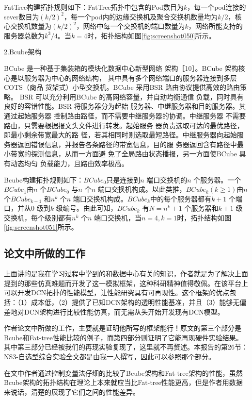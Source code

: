 \documentclass[lang=cn,11pt,a4paper,cite=authoryear]{elegantpaper}
\begin{document}
FatTree构建拓扑规则如下：FatTree拓扑中包含的Pod数目为$k$，每一个pod连接的sever数目为$(k/2)^2$，每一个pod内的边缘交换机及聚合交换机数量均为$k/2$，核心交换机数量为$(k/2)^2$，网络中每一个交换机的端口数量为$k$，网络所能支持的服务器总数为$k^3/4$。当$k=4$时，拓扑结构如图\ref{fig:screenshot050}所示。


2.Bcube架构

BCube 是一种基于集装箱的模块化数据中心新型网络
架构［10］。BCube 架构核心是以服务器为中心的网络结构，
其中具有多个网络端口的服务器连接到多层COTS（商品
货架式）小型交换机。BCube 采用BSR 路由协议提供高效的路由策略。
BSR 可以充分利用BCube 的高网络容量，并自动均衡通信
负载，同时具有良好的容错性能。BSR 将服务器分为起始
服务器、中继服务器和目的服务器。其通过起始服务器
控制路由路径，而不需要中继服务器的协调。中继服务器
不需要路由，只需要根据报文头文件进行转发。起始服务
器负责选取可达的最优路径，即最小剩余带宽最大的路
径，若其相同时则选取最短路径。中继服务器向起始服
务器返回错误信息，并报告各条路径的带宽信息，目的服
务器返回含有路径中最小带宽的探测信息，从而一方面避
免了全局路由状态播报，另一方面使BCube 具有动态均匀
负载能力，且路由效率极高。

Bcube构建拓扑规则如下：$BCube_0$只是连接到$n$ 端口交换机的$n$ 个服务器。一个$BCube_1$由$n$ 个$BCube_0$ 与$n$ 个$n$ 端口交换机构成。以此类推，$BCube_k$$(k\geq1)$由$n$ 个$BCube_{k-1}$ 和$n^k$ 个$n$ 端口交换机构成。$BCube_k$中的每个服务器都有$k + 1$ 个端口，并从$0$ 级到$k$ 级编号。由此可知，$BCube_k$ 有$N = n^k +1$ 个服务器和$k + 1$ 级交换机，每个级别都有$n^k$ 个$n$ 端口交换机，当$n=4,k=1$时，拓扑结构如图\ref{fig:screenshot051}所示。

\subsection{论文中所做的工作}

上面讲的是我在学习过程中学到的和数据中心有关的知识，作者就是为了解决上面提到的那些仿真难题而开发了这一模拟框架，这种科研精神值得敬佩。在该平台上可以开发DCN拓扑的性能模型，让性能研究具有可再现性。这个框架的优点包括：（1）成本低，（2）提供了已知DCN架构的透明性能基准，并且（3）能够无偏差地对DCN架构进行比较性能仿真，而无需从头开始开发现有DCN模型。

作者论文中所做的工作，主要就是证明他所写的框架能行！原文的第三个部分是Bcube和Fat-tree性能比较的例子，而第四部分则证明了它能再现硬件实验结果。其中第三部分已经被我们的再现实验复现了，这里就不再赘述。本报告的第26节：NS3-自选型综合实验全文都是由我一人撰写，因此可以参照那个部分。

在文中作者通过控制变量法仔细的比较了Bcube架构和Fat-tree架构的性能，虽然Bcube架构的拓扑结构在理论上本来就应当比Fat-tree性能更高，但是作者用数据来说话，清楚的展现了它们之间的性能差异。
\end{document}
